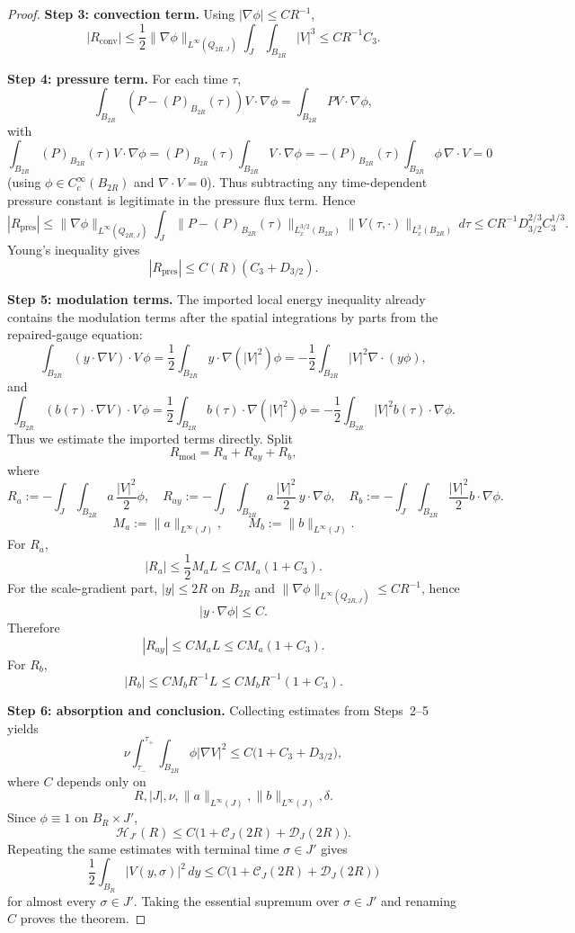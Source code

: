 \documentclass[11pt]{amsart}
\theoremstyle{plain}
\theoremstyle{definition}
\theoremstyle{remark}
\begin{document}
\begin{proof}
\textbf{Step 3: convection term.}
Using $|\nabla\phi|\le CR^{-1}$,
\[
|R_{\mathrm{conv}}|
\le \frac12\|\nabla\phi\|_{L^\infty(Q_{2R,J})}\int_J\!\int_{B_{2R}}|V|^3
\le CR^{-1}C_3.
\]

\textbf{Step 4: pressure term.}
For each time $\tau$,
\[
\int_{B_{2R}}(P-(P)_{B_{2R}}(\tau))V\cdot \nabla\phi
=\int_{B_{2R}}PV\cdot \nabla\phi,
\]
with
\[
\int_{B_{2R}}(P)_{B_{2R}}(\tau)V\cdot \nabla\phi
=(P)_{B_{2R}}(\tau)\int_{B_{2R}}V\cdot \nabla\phi
=-(P)_{B_{2R}}(\tau)\int_{B_{2R}}\phi\,\nabla\cdot V=0
\]
(using $\phi\in C_c^\infty(B_{2R})$ and $\nabla\cdot V=0$).
Thus subtracting any time-dependent pressure constant is legitimate in the
pressure flux term.
Hence
\[
|R_{\mathrm{pres}}|
\le\|\nabla\phi\|_{L^\infty(Q_{2R,J})}
\int_J
\|P-(P)_{B_{2R}}(\tau)\|_{L_x^{3/2}(B_{2R})}
\|V(\tau,\cdot)\|_{L_x^3(B_{2R})}
\,d\tau
\le CR^{-1}D_{3/2}^{2/3}C_3^{1/3}.
\]
Young's inequality gives
\[
|R_{\mathrm{pres}}|\le C(R)(C_3+D_{3/2}).
\]

\textbf{Step 5: modulation terms.}
The imported local energy inequality already contains the modulation terms
after the spatial integrations by parts from the repaired-gauge equation:
\[
\int_{B_{2R}}(y\cdot\nabla V)\cdot V\,\phi
=\frac12\int_{B_{2R}}y\cdot\nabla(|V|^2)\phi
=-\frac12\int_{B_{2R}}|V|^2\nabla\cdot(y\phi),
\]
and
\[
\int_{B_{2R}}(b(\tau)\cdot\nabla V)\cdot V\,\phi
=\frac12\int_{B_{2R}}b(\tau)\cdot\nabla(|V|^2)\phi
=-\frac12\int_{B_{2R}}|V|^2b(\tau)\cdot\nabla\phi.
\]
Thus we estimate the imported terms directly. Split
\[
R_{\mathrm{mod}}=R_a+R_{ay}+R_b,
\]
where
\[
R_a:=-\int_J\!\int_{B_{2R}}a\,\frac{|V|^2}{2}\phi,
\quad
R_{ay}:=-\int_J\!\int_{B_{2R}}a\,\frac{|V|^2}{2}\,y\cdot\nabla\phi,
\quad
R_b:=-\int_J\!\int_{B_{2R}}\frac{|V|^2}{2}b\cdot\nabla\phi.
\]
\[
M_a:=\|a\|_{L^\infty(J)},\qquad M_b:=\|b\|_{L^\infty(J)}.
\]
For $R_a$,
\[
|R_a|
\le \frac12 M_aL
\le C M_a(1+C_3).
\]
For the scale-gradient part, $|y|\le2R$ on $B_{2R}$ and
$\|\nabla\phi\|_{L^\infty(Q_{2R,J})}\le CR^{-1}$, hence
\[
|y\cdot\nabla\phi|\le C.
\]
Therefore
\[
|R_{ay}|\le C M_aL\le C M_a(1+C_3).
\]
For $R_b$,
\[
|R_b|\le C M_bR^{-1}L\le C M_bR^{-1}(1+C_3).
\]

\textbf{Step 6: absorption and conclusion.}
Collecting estimates from Steps~2--5 yields
\[
\nu\int_{\tau_-}^{\tau_+}\!\int_{B_{2R}}\phi|\nabla V|^2
\le C\bigl(1+C_3+D_{3/2}\bigr),
\]
where $C$ depends only on
\[
R,|J|,\nu,\|a\|_{L^\infty(J)},\|b\|_{L^\infty(J)},\delta.
\]
Since $\phi\equiv1$ on $B_R\times J'$,
\[
\mathcal H_{J'}(R)
\le C\bigl(1+\mathcal C_J(2R)+\mathcal D_J(2R)\bigr).
\]
Repeating the same estimates with terminal time $\sigma\in J'$ gives
\[
\frac12\int_{B_R}|V(y,\sigma)|^2\,dy
\le C\bigl(1+\mathcal C_J(2R)+\mathcal D_J(2R)\bigr)
\]
for almost every $\sigma\in J'$. Taking the essential supremum over
$\sigma\in J'$ and renaming $C$ proves the theorem.
\end{proof}
\end{document}
